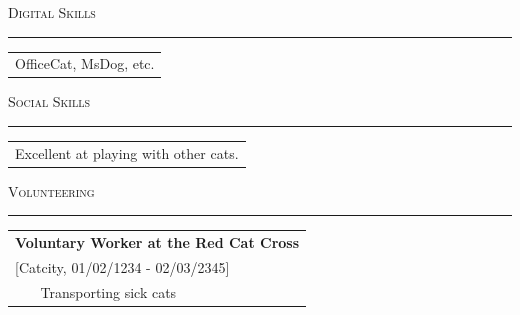 \documentclass[
	fontsize = 10.0pt,
	a4paper,
	parskip = half*,
	twoside,	%
]{scrartcl}
\renewcommand{\arraystretch}{1.5}			%
\newcommand{\hlinewidth}{0.5mm}
\newcommand{\hlinelength}{150mm}
\newcommand{\hlinecolor}{black!25}
\newcommand{\hlinevskip}{-4.0mm}
\begin{document}
	\vspace{5mm}

	{\fontsize{20pt}{17pt}\selectfont\scshape Digital Skills}
	\vskip \hlinevskip%
	\textcolor{\hlinecolor}{\rule{\hlinelength}{\hlinewidth}}

	\renewcommand{\arraystretch}{1.35}			%
	\begin{table}[H]
		\begin{tabular}{ l}
			OfficeCat, MsDog, etc.
		\end{tabular}
	\end{table}%


	\vspace{5mm}

	{\fontsize{20pt}{17pt}\selectfont\scshape Social Skills}
	\vskip \hlinevskip%
	\textcolor{\hlinecolor}{\rule{\hlinelength}{\hlinewidth}}

	\renewcommand{\arraystretch}{1.35}			%
	\begin{table}[H]
		\begin{tabular}{ l}
			Excellent at playing with other cats.
		\end{tabular}
	\end{table}%

	\vspace{5mm}

	{\fontsize{20pt}{17pt}\selectfont\scshape Volunteering}
	\vskip \hlinevskip%
	\textcolor{\hlinecolor}{\rule{\hlinelength}{\hlinewidth}}

	\renewcommand{\arraystretch}{1.25}			%
	\begin{table}[H]
		\begin{tabularx}{\textwidth}{l X}
			\multicolumn{2}{l}{{\fontsize{14pt}{10pt}\selectfont\bfseries Voluntary Worker at the Red Cat Cross}}	\\
			\multicolumn{2}{l}{[Catcity, 01/02/1234 - 02/03/2345]}	\\
			\hspace{1.5mm} & Transporting sick cats\\
		\end{tabularx}
	\end{table}
\end{document}
